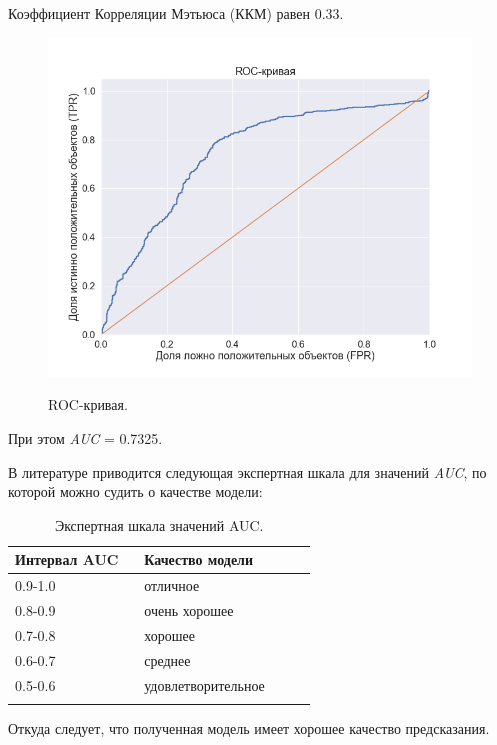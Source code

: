 \documentclass[utf8x, 14pt, oneside, a4paper]{article}
\begin{document}
	Коэффициент Корреляции Мэтьюса (ККМ) равен 0.33.

	\begin{figure}[h!]
		\begin{center}
			{\includegraphics[scale = 0.55]{img/roc_curve.png}}
		\end{center}
		\caption{ROC-кривая.}
		\label{ris:roc_curve}
	\end{figure}

	При этом \textit{AUC} = 0.7325.
	
	В литературе \cite{auc} приводится следующая экспертная шкала для значений \textit{AUC}, по которой можно судить о качестве модели:
	
	\begin{center}
		\begin{longtable}[h!]{|p{0.3\linewidth}|p{0.3\linewidth}|}
			\hline
			{Интервал AUC} & {Качество модели}\\
			\hline
			{0.9-1.0} & {отличное}\\
			\hline
			{0.8-0.9} & {очень хорошее}\\
			\hline
			{0.7-0.8} & {хорошее}\\
			\hline
			{0.6-0.7} & {среднее}\\
			\hline
			{0.5-0.6} & {удовлетворительное}\\
			\hline
			\caption{Экспертная шкала значений AUC.}
		\end{longtable}
	\end{center}

	Откуда следует, что полученная модель имеет хорошее качество предсказания.
	
\end{document}

